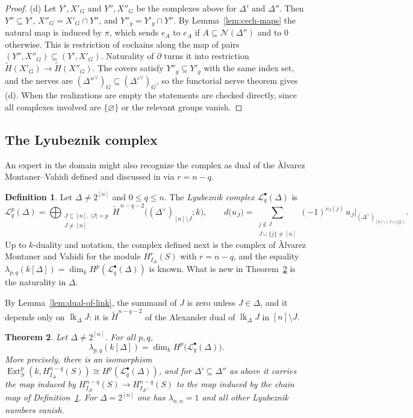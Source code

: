 \documentclass[11pt]{article}
\theoremstyle{plain}
\newtheorem{theorem}{Theorem}[section]
\theoremstyle{definition}
\newtheorem{definition}[theorem]{Definition}
\newcommand{\kk}{k}
\newcommand{\link}{\operatorname{lk}}
\newcommand{\Ext}{\operatorname{Ext}}
\newcommand{\rH}{\widetilde{H}}
\newcommand{\Hloc}[2]{H^{#1}_{#2}}
\newcommand{\Nf}{\mathcal N}
\newcommand{\Lc}{\mathcal L}
\begin{document}
\begin{proof}
(d) Let $Y',X'_G$ and $Y'',X''_G$ be the complexes above for $\Delta'$ and $\Delta''$. Then $Y''\subseteq Y'$,
$X''_G=X'_G\cap Y''$, and $Y''_g=Y'_g\cap Y''$. By Lemma~\ref{lem:cech-maps} the natural map is induced by $\pi$,
which sends $e_A$ to $e_A$ if $A\subseteq\Nf(\Delta'')$ and to $0$ otherwise. This is restriction of cochains along
the map of pairs $(Y'',X''_G)\subseteq(Y',X'_G)$. Naturality of $\partial$ turns it into restriction
$\rH(X'_G)\to\rH(X''_G)$. The covers satisfy $Y''_g\subseteq Y'_g$ with the same index set, and the nerves are
$(\Delta''^\vee)_G\subseteq(\Delta'^\vee)_G$, so the functorial nerve theorem gives (d). When the realizations are
empty the statements are checked directly, since all complexes involved are $\{\varnothing\}$ or the relevant groups
vanish.
\end{proof}

\subsection{The Lyubeznik complex}
An expert in the domain might also recognize the complex as dual of the Àlvarez Montaner–Vahidi defined and discussed in \cite[\S4]{AlvarezMontanerVahidi} via $r = n - q$.
\begin{definition}\label{def:lyub-complex}
Let $\Delta\neq2^{[n]}$ and $0\le q\le n$. The \emph{Lyubeznik complex} $\Lc^\bullet_q(\Delta)$ is
\[
\Lc^p_q(\Delta)=\bigoplus_{\substack{J\subseteq[n],\ |J|=p\\ J\neq[n]}}\rH^{\,n-q-2}\bigl((\Delta^\vee)_{[n]\setminus J};\kk\bigr),
\qquad
d\bigl(u_J\bigr)=\sum_{\substack{j\notin J\\ J\cup\{j\}\neq[n]}}(-1)^{\nu_J(j)}\,u_J\big|_{(\Delta^\vee)_{[n]\setminus(J\cup\{j\})}} .
\]
Up to $\kk$-duality and notation, the complex defined next is the complex of \`Alvarez
Montaner and Vahidi \cite[Prop.~3.3, Cor.~3.4 and \S4]{AlvarezMontanerVahidi} for the
module $\Hloc{r}{I_\Delta}(S)$ with $r=n-q$, and the equality
$\lambda_{p,q}(\kk[\Delta])=\dim_\kk H^p(\Lc^\bullet_q(\Delta))$ is known. What is new in
Theorem~\ref{thm:lyub-complex} is the naturality in $\Delta$.
\end{definition}

By Lemma~\ref{lem:dual-of-link}, the summand of $J$ is zero unless $J\in\Delta$, and it depends only on
$\link_\Delta J$: it is $\rH^{n-q-2}$ of the Alexander dual of $\link_\Delta J$ in $[n]\setminus J$.

\begin{theorem}\label{thm:lyub-complex}
Let $\Delta\neq2^{[n]}$. For all $p,q$,
\[
\lambda_{p,q}(\kk[\Delta])=\dim_\kk H^p\bigl(\Lc^\bullet_q(\Delta)\bigr).
\]
More precisely, there is an isomorphism $\Ext^p_S(\kk,\Hloc{n-q}{I_\Delta}(S))\cong H^p(\Lc^\bullet_q(\Delta))$, and for
$\Delta'\subseteq\Delta''$ as above it carries the map induced by $\Hloc{n-q}{I_{\Delta'}}(S)\to\Hloc{n-q}{I_{\Delta''}}(S)$
to the map induced by the chain map of Definition~\ref{def:lyub-complex}. For $\Delta=2^{[n]}$ one has
$\lambda_{n,n}=1$ and all other Lyubeznik numbers vanish.
\end{theorem}
\end{document}
